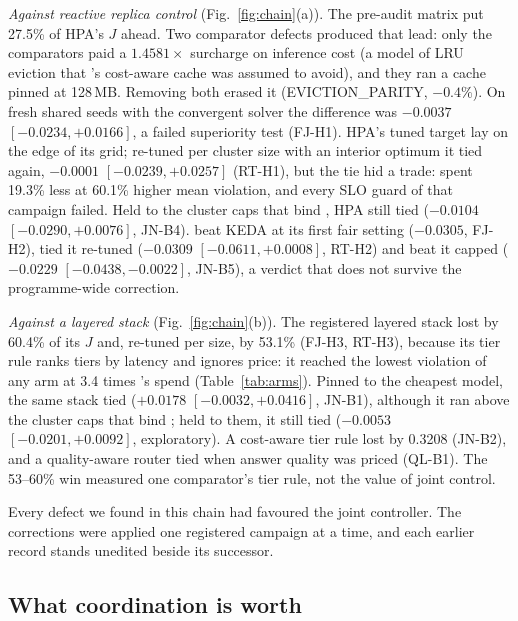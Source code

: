 \emph{Against reactive replica control} (Fig.~\ref{fig:chain}(a)). The
pre-audit matrix put \jcac{} 27.5\% of HPA's $J$ ahead. Two comparator
defects produced that lead: only the comparators paid a $1.4581\times$
surcharge on inference cost (a model of LRU eviction that \jcac{}'s
cost-aware cache was assumed to avoid), and they ran a cache pinned at
128\,MB. Removing both erased it (EVICTION\_PARITY, $-0.4\%$). On fresh
shared seeds with the convergent solver the difference was $-0.0037$
$[-0.0234,+0.0166]$, a failed superiority test (FJ-H1). HPA's tuned target
lay on the edge of its grid; re-tuned per cluster size with an interior
optimum it tied again, $-0.0001$ $[-0.0239,+0.0257]$ (RT-H1), but the tie
hid a trade: \jcac{} spent 19.3\% less at 60.1\% higher mean violation, and
every SLO guard of that campaign failed. Held to the cluster caps that bind
\jcac{}, HPA still tied ($-0.0104$ $[-0.0290,+0.0076]$, JN-B4). \jcac{} beat
KEDA at its first fair setting ($-0.0305$, FJ-H2), tied it re-tuned
($-0.0309$ $[-0.0611,+0.0008]$, RT-H2) and beat it capped ($-0.0229$
$[-0.0438,-0.0022]$, JN-B5), a verdict that does not survive the
programme-wide correction.

\emph{Against a layered stack} (Fig.~\ref{fig:chain}(b)). The registered
layered stack lost by 60.4\% of its $J$ and, re-tuned per size, by 53.1\%
(FJ-H3, RT-H3), because its tier rule ranks tiers by latency and ignores
price: it reached the lowest violation of any arm at 3.4 times \jcac{}'s
spend (Table~\ref{tab:arms}). Pinned to the cheapest model, the same stack
tied \jcac{} ($+0.0178$ $[-0.0032,+0.0416]$, JN-B1), although it ran above
the cluster caps that bind \jcac{}; held to them, it still tied ($-0.0053$
$[-0.0201,+0.0092]$, exploratory). A cost-aware tier rule
lost by 0.3208 (JN-B2), and a quality-aware router tied when answer quality was priced (QL-B1).
The 53--60\% win measured one comparator's tier rule, not the value of
joint control.

Every defect we found in this chain had favoured the joint controller.
The corrections were applied one registered campaign at a time, and each
earlier record stands unedited beside its successor.

\subsection{What coordination is worth}
\label{sec:coordination}

